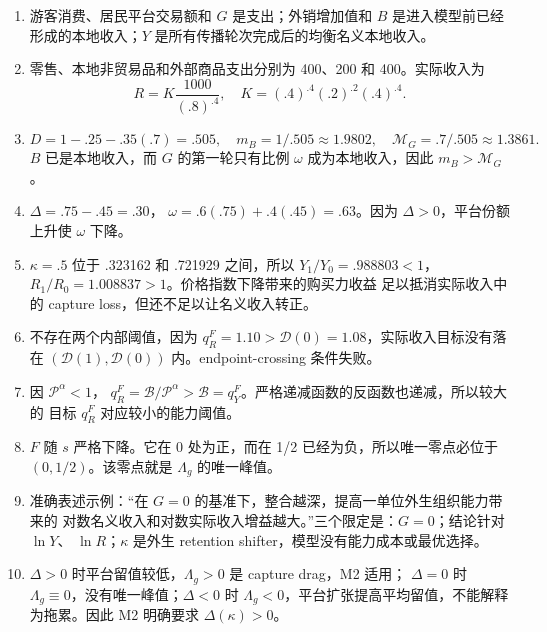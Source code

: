 \documentclass[UTF8,11pt,scheme=chinese,fontset=fandol]{ctexart}
\newcommand{\calB}{\mathcal B}
\newcommand{\calD}{\mathcal D}
\newcommand{\calP}{\mathcal P}
\newcommand{\MG}{\mathcal M_G}
\theoremstyle{definition}
\begin{document}
\begin{enumerate}
  \item 游客消费、居民平台交易额和 \(G\) 是支出；外销增加值和 \(B\) 是进入模型前已经
  形成的本地收入；\(Y\) 是所有传播轮次完成后的均衡名义本地收入。

  \item 零售、本地非贸易品和外部商品支出分别为 400、200 和 400。实际收入为
  \[
  R=K\frac{1000}{(.8)^{.4}},
  \quad K=(.4)^{.4}(.2)^{.2}(.4)^{.4}.
  \]

  \item
  \[
  D=1-.25-.35(.7)=.505,
  \quad m_B=1/.505\approx1.9802,
  \quad \MG=.7/.505\approx1.3861.
  \]
  \(B\) 已是本地收入，而 \(G\) 的第一轮只有比例 \(\omega\) 成为本地收入，因此
  \(m_B>\MG\)。

  \item \(\Delta=.75-.45=.30\)，
  \(\omega=.6(.75)+.4(.45)=.63\)。因为 \(\Delta>0\)，平台份额上升使
  \(\omega\) 下降。

  \item \(\kappa=.5\) 位于 .323162 和 .721929 之间，所以
  \(Y_1/Y_0=.988803<1\)，\(R_1/R_0=1.008837>1\)。价格指数下降带来的购买力收益
  足以抵消实际收入中的 capture loss，但还不足以让名义收入转正。

  \item 不存在两个内部阈值，因为 \(q_R^F=1.10>\calD(0)=1.08\)，实际收入目标没有落在
  \((\calD(1),\calD(0))\) 内。endpoint-crossing 条件失败。

  \item 因 \(\calP^\alpha<1\)，
  \(q_R^F=\calB/\calP^\alpha>\calB=q_Y^F\)。严格递减函数的反函数也递减，所以较大的
  目标 \(q_R^F\) 对应较小的能力阈值。

  \item \(F\) 随 \(s\) 严格下降。它在 0 处为正，而在 1/2 已经为负，所以唯一零点必位于
  \((0,1/2)\)。该零点就是 \(\Lambda_g\) 的唯一峰值。

  \item 准确表述示例：“在 \(G=0\) 的基准下，整合越深，提高一单位外生组织能力带来的
  对数名义收入和对数实际收入增益越大。”三个限定是：\(G=0\)；结论针对 \(\ln Y\)、
  \(\ln R\)；\(\kappa\) 是外生 retention shifter，模型没有能力成本或最优选择。

  \item \(\Delta>0\) 时平台留值较低，\(\Lambda_g>0\) 是 capture drag，M2 适用；
  \(\Delta=0\) 时 \(\Lambda_g\equiv0\)，没有唯一峰值；\(\Delta<0\) 时
  \(\Lambda_g<0\)，平台扩张提高平均留值，不能解释为拖累。因此 M2 明确要求
  \(\Delta(\kappa)>0\)。
\end{enumerate}
\end{document}
